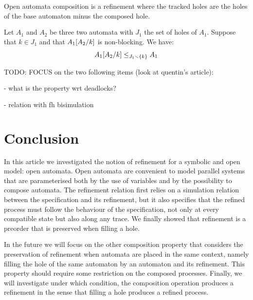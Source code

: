 \documentclass[runningheads]{llncs}
\begin{document}
Open automata composition is a refinement where
the tracked holes are the holes of the base automaton minus the composed hole.
\begin{theorem}\label{thm:Composition}
Let $A_1$ and  $A_2$  be three two automata with $J_1$ the set of holes of $A_1$.
Suppose that \(k \in J_1\) and that \(A_1\subst{A_2}{k}\) is non-blocking. We have:
\[ \wrel{A_1\subst{A_2}{k}}{A_1}{J_1\setminus \{k\}}\]
\end{theorem}


TODO: FOCUS on the two following items (look at quentin's article):


- what is the property wrt deadlocks?


- relation with fh bisimulation



\section{Conclusion}\label{sec:ccl}
In this article we investigated the notion of refinement for a symbolic and open model: open automata. 
Open automata are convenient to model parallel systems that are parameterised both by the use of variables and by the possibility to compose automata.
The refinement relation first relies on a simulation relation between the specification and its refinement, but it also specifies that the refined process must follow the behaviour of the specification, not only at every compatible state but also along any trace.
We finally showed that refinement is a preorder that is preserved when filling a hole.

In the future we will focus on the other composition property that considers the preservation of refinement when automata are placed in the same context, namely filling the hole of the same automaton by an automaton and its refinement. This property should require some restriction on the composed processes.
 Finally, we will investigate under which condition, the composition operation produces a refinement in the sense that filling a hole produces a refined process.

 
 

\end{document}

